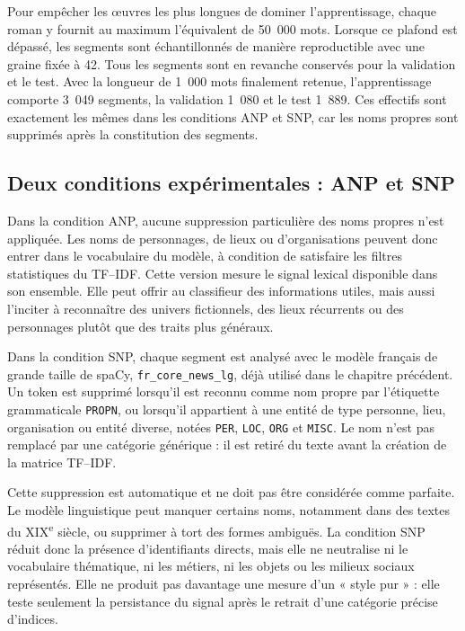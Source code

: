 Pour empêcher les œuvres les plus longues de dominer l'apprentissage, chaque roman y fournit au maximum l'équivalent de 50~000 mots. Lorsque ce plafond est dépassé, les segments sont échantillonnés de manière reproductible avec une graine fixée à 42. Tous les segments sont en revanche conservés pour la validation et le test. Avec la longueur de 1~000 mots finalement retenue, l'apprentissage comporte 3~049 segments, la validation 1~080 et le test 1~889. Ces effectifs sont exactement les mêmes dans les conditions ANP et SNP, car les noms propres sont supprimés après la constitution des segments.

\subsection{Deux conditions expérimentales : ANP et SNP}

Dans la condition ANP, aucune suppression particulière des noms propres n'est appliquée. Les noms de personnages, de lieux ou d'organisations peuvent donc entrer dans le vocabulaire du modèle, à condition de satisfaire les filtres statistiques du TF--IDF. Cette version mesure le signal lexical disponible dans son ensemble. Elle peut offrir au classifieur des informations utiles, mais aussi l'inciter à reconnaître des univers fictionnels, des lieux récurrents ou des personnages plutôt que des traits plus généraux.

Dans la condition SNP, chaque segment est analysé avec le modèle français de grande taille de spaCy, \texttt{fr\_core\_}\allowbreak\texttt{news\_lg}, déjà utilisé dans le chapitre précédent. Un token est supprimé lorsqu'il est reconnu comme nom propre par l'étiquette grammaticale \texttt{PROPN}, ou lorsqu'il appartient à une entité de type personne, lieu, organisation ou entité diverse, notées \texttt{PER}, \texttt{LOC}, \texttt{ORG} et \texttt{MISC}. Le nom n'est pas remplacé par une catégorie générique : il est retiré du texte avant la création de la matrice TF--IDF.

Cette suppression est automatique et ne doit pas être considérée comme parfaite. Le modèle linguistique peut manquer certains noms, notamment dans des textes du XIX\textsuperscript{e} siècle, ou supprimer à tort des formes ambiguës. La condition SNP réduit donc la présence d'identifiants directs, mais elle ne neutralise ni le vocabulaire thématique, ni les métiers, ni les objets ou les milieux sociaux représentés. Elle ne produit pas davantage une mesure d'un « style pur » : elle teste seulement la persistance du signal après le retrait d'une catégorie précise d'indices.

